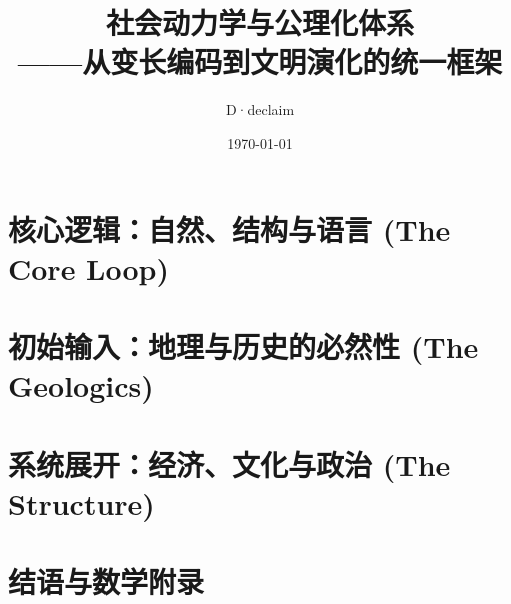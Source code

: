 \documentclass[openany, a4paper, 12pt]{book}
\title{\textbf{社会动力学与公理化体系}\\ \large ——从变长编码到文明演化的统一框架}
\author{D·declaim}
\date{\today}
\begin{document}
	
	\maketitle      %
	
	\frontmatter
	
	\tableofcontents %
	
	\mainmatter     %

	
	

	\part{核心逻辑：自然、结构与语言 (The Core Loop)}
	
	
	
	
	\part{初始输入：地理与历史的必然性 (The Geologics)}
	
	
	
	\part{系统展开：经济、文化与政治 (The Structure)}
	
	
	
	
	
	\part{结语与数学附录}
	
	
	\appendix
	
	
	\backmatter
	
	
\end{document}
